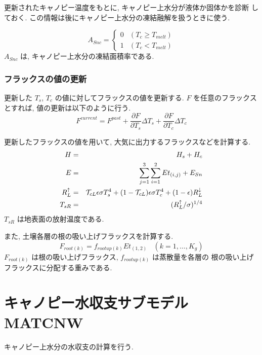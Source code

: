   更新されたキャノピー温度をもとに, キャノピー上水分が液体か固体かを診断
  しておく. この情報は後にキャノピー上水分の凍結融解を扱うときに使う. 

\begin{equation}
 A_{Snc} = \left\{
\begin{array}{ll}
 0& (T_c \geq T_{melt})\\
 1& (T_c <    T_{melt})
\end{array}
\right.
\end{equation}
$A_{Snc}$ は, キャノピー上水分の凍結面積率である. 

\subsubsection{フラックスの値の更新}

更新した $T_s$, $T_c$ の値に対してフラックスの値を更新する. 
$F$ を任意のフラックスとすれば, 値の更新は以下のように行う. 
\begin{equation}
 F^{current} = F^{past} + \frac{\partial F}{\partial T_s} \Delta T_s
                        + \frac{\partial F}{\partial T_c} \Delta T_c
\end{equation}

更新したフラックスの値を用いて, 大気に出力するフラックスなどを計算する. 
\begin{eqnarray}
 H &=& H_s + H_c \\
 E &=& \sum_{j=1}^3 \sum_{i=1}^2 Et_{(i,j)} + E_{Sn} \\
 R^{\uparrow}_L &=& {\cal{T}}_{cL} \epsilon \sigma T_s^4  
 + (1 - {\cal{T}}_{cL}) \epsilon \sigma T_c^4 
 + (1 - \epsilon) R^{\downarrow}_L \\
 T_{sR} &=& ( R^{\uparrow}_L / \sigma )^{1/4}
\end{eqnarray}
$T_{sR}$ は地表面の放射温度である. 

また, 土壌各層の根の吸い上げフラックスを計算する. 
\begin{equation}
 F_{root(k)} = f_{rootup(k)} Et_{(1,2)} \ \ \ \ (k=1,\ldots,K_g)
\end{equation}
$F_{root(k)}$ は根の吸い上げフラックス, $f_{rootup(k)}$ は蒸散量を各層の
根の吸い上げフラックスに分配する重みである. 

\section{キャノピー水収支サブモデル MATCNW}

キャノピー上水分の水収支の計算を行う. 

